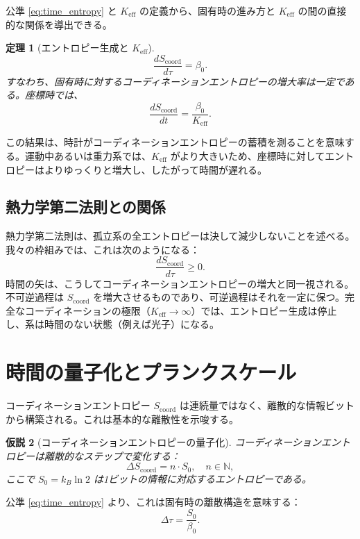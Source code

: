 \documentclass[12pt,a4paper]{article}
\newtheorem{theorem}{定理}[section]
\newtheorem{hypothesis}[theorem]{仮説}
\newcommand{\Keff}{K_{\mathrm{eff}}}
\newcommand{\Scoord}{S_{\mathrm{coord}}}
\begin{document}
	公準 \ref{eq:time_entropy} と \(\Keff\) の定義から、固有時の進み方と \(\Keff\) の間の直接的な関係を導出できる。
	
	\begin{theorem}[エントロピー生成と \(\Keff\)]
		\[
		\frac{d\Scoord}{d\tau} = \beta_0.
		\]
		すなわち、固有時に対するコーディネーションエントロピーの増大率は一定である。座標時では、
		\[
		\frac{d\Scoord}{dt} = \frac{\beta_0}{\Keff}.
		\]
	\end{theorem}
	
	この結果は、時計がコーディネーションエントロピーの蓄積を測ることを意味する。運動中あるいは重力系では、\(\Keff\) がより大きいため、座標時に対してエントロピーはよりゆっくりと増大し、したがって時間が遅れる。
	
	\subsection{熱力学第二法則との関係}
	
	熱力学第二法則は、孤立系の全エントロピーは決して減少しないことを述べる。我々の枠組みでは、これは次のようになる：
	\begin{equation}
		\frac{d\Scoord}{d\tau} \ge 0.
	\end{equation}
	時間の矢は、こうしてコーディネーションエントロピーの増大と同一視される。不可逆過程は \(\Scoord\) を増大させるものであり、可逆過程はそれを一定に保つ。完全なコーディネーションの極限（\(\Keff \to \infty\)）では、エントロピー生成は停止し、系は時間のない状態（例えば光子）になる。
	
	\section{時間の量子化とプランクスケール}
	\label{sec:quantization}
	
	コーディネーションエントロピー \(\Scoord\) は連続量ではなく、離散的な情報ビットから構築される。これは基本的な離散性を示唆する。
	
	\begin{hypothesis}[コーディネーションエントロピーの量子化]
		コーディネーションエントロピーは離散的なステップで変化する：
		\begin{equation}
			\Delta \Scoord = n \cdot S_0, \quad n \in \mathbb{N},
		\end{equation}
		ここで \(S_0 = k_B \ln 2\) は1ビットの情報に対応するエントロピーである。
	\end{hypothesis}
	
	公準 \ref{eq:time_entropy} より、これは固有時の離散構造を意味する：
	\begin{equation}
		\Delta \tau = \frac{S_0}{\beta_0}.
	\end{equation}
	
\end{document}

